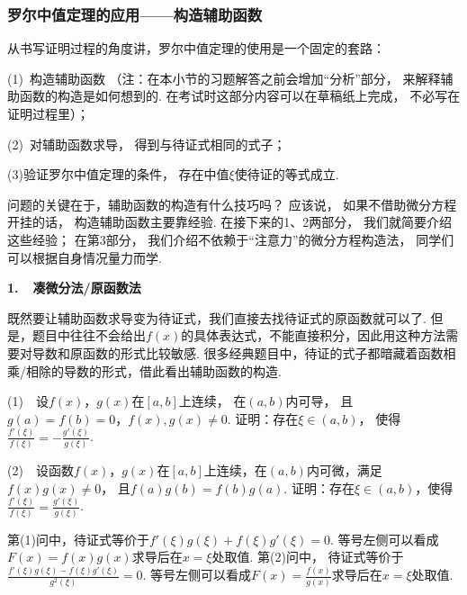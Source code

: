 
\subsubsection{罗尔中值定理的应用——构造辅助函数} \par

从书写证明过程的角度讲，罗尔中值定理的使用是一个固定的套路：\par
(1)~构造辅助函数
（注：在本小节的习题解答之前会增加“分析”部分，
来解释辅助函数的构造是如何想到的.
在考试时这部分内容可以在草稿纸上完成，
不必写在证明过程里）；

(2)~对辅助函数求导，
得到与待证式相同的式子；

(3)验证罗尔中值定理的条件，
存在中值$\xi$使待证的等式成立.

问题的关键在于，辅助函数的构造有什么技巧吗？
应该说，
如果不借助微分方程开挂的话，
构造辅助函数主要靠经验.
在接下来的1、2两部分，
我们就简要介绍这些经验；
在第3部分，
我们介绍不依赖于“注意力”的微分方程构造法，
同学们可以根据自身情况量力而学.\par \vspace{1em}

\textbf{1.~~凑微分法/原函数法}\par \vspace{0.5em}
既然要让辅助函数求导变为待证式，我们直接去找待证式的原函数就可以了.
但是，题目中往往不会给出$f(x)$的具体表达式，不能直接积分，因此用这种方法需要对导数和原函数的形式比较敏感.
很多经典题目中，待证的式子都暗藏着函数相乘/相除的导数的形式，借此看出辅助函数的构造.

\begin{example}
\label{ex:ch04-23}

(1)~~设$f(x)$，$g(x)$在$[a, b]$上连续，
在$(a,b)$内可导，
且$g(a)=f(b)=0$，$f(x), g(x)\ne 0$.
证明：存在$\xi \in (a,b)$，
使得$\frac{f'(\xi)}{f(\xi)}=-\frac{g'(\xi)}{g(\xi)}$. \par

(2)~~设函数$f(x)$，$g(x)$在$[a,b]$上连续，在$(a,b)$内可微，满足$f(x)g(x)\ne 0$，
且$f(a)g(b)=f(b)g(a)$.
证明：存在$\xi \in (a,b)$，使得$\frac{f'(\xi)}{f(\xi)}=\frac{g'(\xi)}{g(\xi)}$.
\end{example}

\begin{analysis}
第(1)问中，待证式等价于$f'(\xi)g(\xi) + f(\xi) g'(\xi) = 0$.
等号左侧可以看成$F(x) = f(x)g(x)$求导后在$x = \xi$处取值.
第(2)问中，
待证式等价于$\frac{f'(\xi)g(\xi) - f(\xi)g'(\xi)}{g^2(\xi)} = 0$.
等号左侧可以看成$F(x) = \frac{f(x)}{g(x)}$求导后在$x = \xi$处取值.
\end{analysis}

